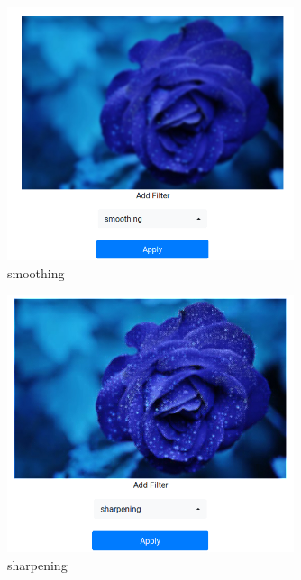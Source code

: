 \documentclass{article}
\begin{document}
  \begin{figure}[!htb]
    \centering
    \includegraphics[width=0.75\textwidth]{assets/smoothing.png}
    \caption{smoothing}
    \label{fig:smoothing}
  \end{figure}

  \begin{figure}[!htb]
    \centering
    \includegraphics[width=0.75\textwidth]{assets/sharpened.png}
    \caption{sharpening}
    \label{fig:sharpened}
  \end{figure}
\end{document}
